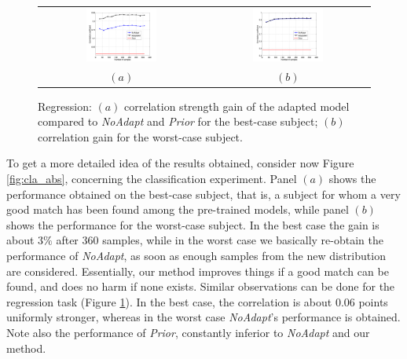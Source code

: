 \begin{figure}[!ht] \centering
  \begin{tabular}{cc}
    \includegraphics[width=0.45\textwidth]{figs/exp2_abs_best} &
    \includegraphics[width=0.45\textwidth]{figs/exp2_abs_worst} \\
    $(a)$ & $(b)$ \\
  \end{tabular}
  \caption{Regression: $(a)$ correlation strength gain
    of the adapted model compared to \emph{NoAdapt} and \emph{Prior}
    for the best-case subject; $(b)$ correlation gain for
    the worst-case subject.}
  \label{fig:reg_abs}
\end{figure}

To get a more detailed idea of the results obtained, consider now Figure \ref{fig:cla_abs},
concerning the classification experiment. Panel $(a)$ shows the
performance obtained on the best-case subject, that is, a subject for
whom a very good match has been found among the pre-trained models,
while panel $(b)$ shows the performance for the worst-case subject. In
the best case the gain is about $3\%$ after 360 samples, while
in the worst case we basically re-obtain the performance of
\emph{NoAdapt}, as soon as enough samples from the new distribution
are considered. Essentially, our method improves things if a good
match can be found, and does no harm if none exists.
Similar observations can be done for the regression task (Figure
\ref{fig:reg_abs}). In the best case, the correlation is about
0.06 points uniformly stronger, whereas in the
worst case \emph{NoAdapt}'s performance is obtained.
Note also the performance of \emph{Prior}, constantly inferior to
\emph{NoAdapt} and our method.

